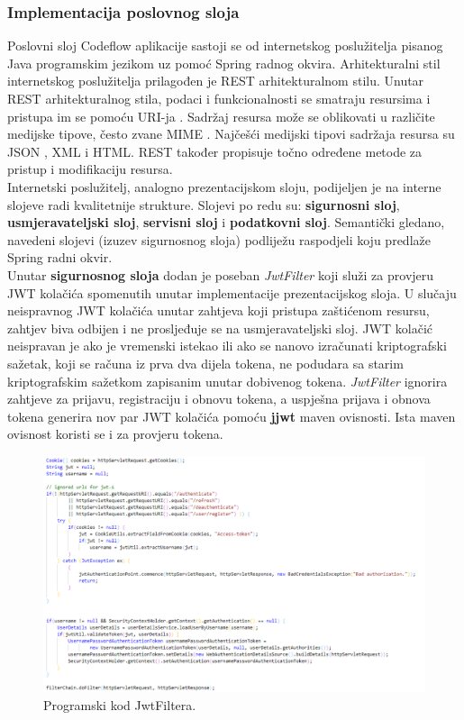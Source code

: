 \documentclass[times, utf8, zavrsni, numeric]{fer}
\begin{document}
	 		\subsubsection{Implementacija poslovnog sloja}
	 		Poslovni sloj Codeflow aplikacije sastoji se od internetskog poslužitelja pisanog Java programskim jezikom uz pomoć Spring radnog okvira. Arhitekturalni stil internetskog poslužitelja prilagođen je REST  arhitekturalnom stilu. Unutar REST arhitekturalnog stila, podaci i funkcionalnosti se smatraju resursima i pristupa im se pomoću URI-ja . Sadržaj resursa može se oblikovati u različite medijske tipove, često zvane MIME . Najčešći medijski tipovi sadržaja resursa su JSON , XML  i HTML. REST također propisuje točno određene metode za pristup i modifikaciju resursa\cite{rest2021}.\\ Internetski poslužitelj, analogno prezentacijskom sloju, podijeljen je na interne slojeve radi kvalitetnije strukture. Slojevi po redu su: \textbf{sigurnosni sloj}, \textbf{usmjeravateljski sloj}, \textbf{servisni sloj} i \textbf{podatkovni sloj}. Semantički gledano, navedeni slojevi (izuzev sigurnosnog sloja) podliježu raspodjeli koju predlaže Spring radni okvir.\\
	 		Unutar \textbf{sigurnosnog sloja} dodan je poseban \textit{JwtFilter} koji služi za provjeru JWT kolačića spomenutih unutar implementacije prezentacijskog sloja. U slučaju neispravnog JWT kolačića unutar zahtjeva koji pristupa zaštićenom resursu, zahtjev biva odbijen i ne prosljeđuje se na usmjeravateljski sloj. JWT kolačić neispravan je ako je vremenski istekao ili ako se nanovo izračunati kriptografski sažetak, koji se računa  iz prva dva dijela tokena, ne podudara sa starim kriptografskim sažetkom zapisanim unutar dobivenog tokena. \textit{JwtFilter} ignorira zahtjeve za prijavu, registraciju i obnovu tokena, a uspješna prijava i obnova tokena generira nov par JWT kolačića pomoću \textbf{jjwt}\cite{jjwt2021} maven ovisnosti. Ista maven ovisnost koristi se i za provjeru tokena.
	 		\begin{figure}[H]
	 			\centering
	 			\includegraphics[width=\linewidth]{pictures/prikazi/JwtFilter.png}
	 			\caption{Programski kod JwtFiltera.}
	 			\label{fig:jwtfilter}
	 		\end{figure}
 		
\end{document}
